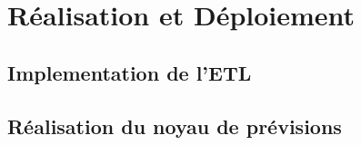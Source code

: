 \chapter{Réalisation et Déploiement}

\cleardoublepage

	\section{Implementation de l'ETL}
	\section{Réalisation du noyau de prévisions}
